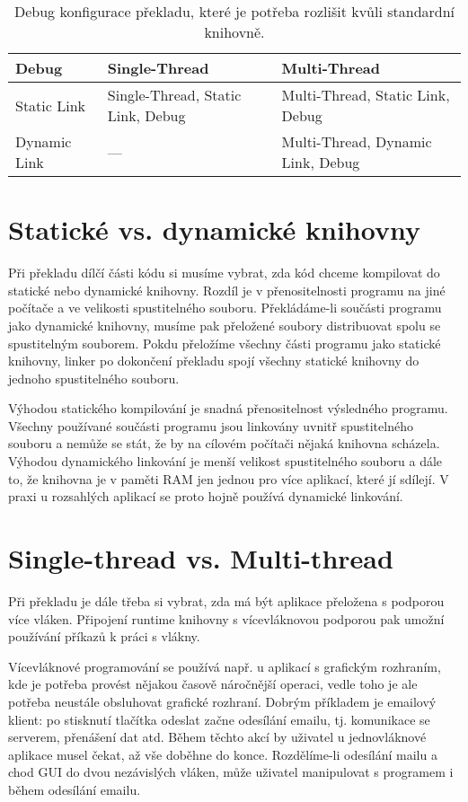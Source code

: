 \begin{table}[ht]
	\caption{Debug konfigurace překladu, které je potřeba rozlišit kvůli standardní knihovně.}
  \label{table:konfigurace2}
	\centering
\begin{tabular}{| l|| p{5cm} | p{5.5cm}  |}
  \hline                       
  Debug & Single-Thread & Multi-Thread \\
  \hline
  \hline                     
  Static Link & Single-Thread, Static Link, Debug & Multi-Thread, Static Link, Debug\\
  \hline
  Dynamic Link & --- & Multi-Thread, Dynamic Link, Debug\\
  \hline  
\end{tabular}

\end{table}

\section{Statické vs. dynamické knihovny}
Při překladu dílčí části kódu si musíme vybrat, zda kód chceme kompilovat do statické nebo dynamické knihovny. Rozdíl je v přenositelnosti programu na jiné počítače a ve velikosti spustitelného souboru. Překládáme-li součásti programu jako dynamické knihovny, musíme pak přeložené soubory distribuovat spolu se spustitelným souborem. Pokdu přeložíme všechny části programu jako statické knihovny, linker po dokončení překladu spojí všechny statické knihovny do jednoho spustitelného souboru.

Výhodou statického kompilování je snadná přenositelnost výsledného programu. Všechny používané součásti programu jsou linkovány uvnitř spustitelného souboru a nemůže se stát, že by na cílovém počítači nějaká knihovna scházela. Výhodou dynamického linkování je menší velikost spustitelného souboru a dále to, že knihovna je v paměti RAM jen jednou pro více aplikací, které jí sdílejí. V praxi u rozsahlých aplikací se proto hojně používá dynamické linkování.

\section{Single-thread vs. Multi-thread}
Při překladu je dále třeba si vybrat, zda má být aplikace přeložena s podporou více vláken. Připojení runtime knihovny s vícevláknovou podporou pak umožní používání příkazů k práci s vlákny.

Vícevláknové programování se používá např. u aplikací s grafickým rozhraním, kde je potřeba provést nějakou časově náročnější operaci, vedle toho je ale potřeba neustále obsluhovat grafické rozhraní. Dobrým příkladem je emailový klient: po stisknutí tlačítka odeslat začne odesílání emailu, tj. komunikace se serverem, přenášení dat atd. Během těchto akcí by uživatel u jednovláknové aplikace musel čekat, až vše doběhne do konce. Rozdělíme-li odesílání mailu a chod GUI do dvou nezávislých vláken, může uživatel manipulovat s programem i během odesílání emailu.

